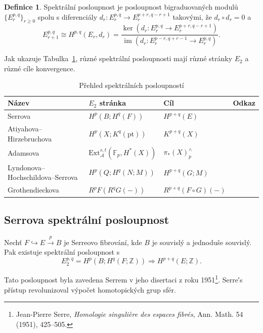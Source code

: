 \documentclass[12pt,a4paper]{article}
\theoremstyle{plain}
\theoremstyle{definition}
\newtheorem{definition}[theorem]{Definice}
\theoremstyle{remark}
\begin{document}
\begin{definition}
\label{def:ss}
Spektr\'{a}ln\'{i} posloupnost je posloupnost bigraduovan\'{y}ch modul\r{u}
$\{E_r^{p,q}\}_{r \geq 0}$ spolu s diferenci\'{a}ly $d_r \colon E_r^{p,q} \to E_r^{p+r,q-r+1}$
takov\'{y}mi, \v{z}e $d_r \circ d_r = 0$ a
\begin{equation}
\label{eq:ss_konvergence}
E_{r+1}^{p,q} \cong H^{p,q}(E_r, d_r) = \frac{\ker(d_r \colon E_r^{p,q} \to E_r^{p+r,q-r+1})}{\operatorname{im}(d_r \colon E_r^{p-r,q+r-1} \to E_r^{p,q})}.
\end{equation}
\end{definition}

Jak ukazuje Tabulka~\ref{tab:ss_priklady}, r\r{u}zn\'{e} spektr\'{a}ln\'{i}
posloupnosti maj\'{i} r\r{u}zn\'{e} str\'{a}nky $E_2$ a r\r{u}zn\'{e} c\'{i}le konvergence.

\begin{table}[ht]
\centering
\caption{P\v{r}ehled spektr\'{a}ln\'{i}ch posloupnost\'{i}}
\label{tab:ss_priklady}
\begin{tabular}{llll}
\toprule
N\'{a}zev & $E_2$ str\'{a}nka & C\'{i}l & Odkaz \\
\midrule
Serrova & $H^p(B; H^q(F))$ & $H^{p+q}(E)$ & \citet{serre1951} \\
Atiyahova--Hirzebruchova & $H^p(X; K^q(\mathrm{pt}))$ & $K^{p+q}(X)$ & \citet{atiyah1961} \\
Adamsova & $\mathrm{Ext}^{s,t}_{\mathcal{A}}(\mathbb{F}_p, H^*(X))$ & $\pi_*(X)_p^{\wedge}$ & \citet{adams1958} \\
Lyndonova--Hochschildova--Serrova & $H^p(Q; H^q(N; M))$ & $H^{p+q}(G; M)$ & \citet{lyndon1948} \\
Grothendieckova & $R^p F(R^q G(-))$ & $R^{p+q}(F \circ G)(-)$ & \citet{grothendieck1957} \\
\bottomrule
\end{tabular}
\end{table}

\subsection{Serrova spektr\'{a}ln\'{i} posloupnost}

Nech\v{t} $F \hookrightarrow E \xrightarrow{p} B$ je Serreovo fibrov\'{a}n\'{i},
kde $B$ je souvisl\'{y} a jednodu\v{s}e souvisl\'{y}. Pak existuje spektr\'{a}ln\'{i}
posloupnost s
\[
E_2^{p,q} = H^p(B; H^q(F; \mathbb{Z})) \Longrightarrow H^{p+q}(E; \mathbb{Z}).
\]

Tato posloupnost byla zavedena Serrem v jeho disertaci z roku 1951\footnote{%
Jean-Pierre Serre, \emph{Homologie singuli\`{e}re des espaces fibr\'{e}s},
Ann. Math. 54 (1951), 425--505.}. Serre′s p\v{r}\'{i}stup revolunizoval
v\'{y}po\v{c}et homotopick\'{y}ch grup sf\'{e}r.
\end{document}
